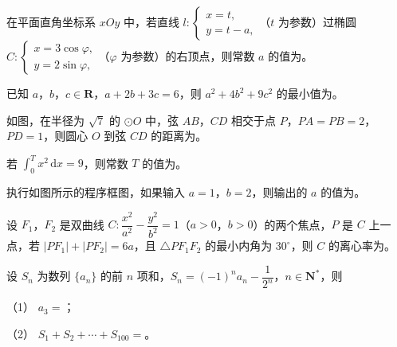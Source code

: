 \begin{question}
在平面直角坐标系 $xOy$ 中，若直线 $l:\begin{cases}x=t,\\y=t-a,\end{cases}$（$t$ 为参数）过椭圆 $C:\begin{cases}x=3\cos\varphi,\\y=2\sin\varphi,\end{cases}$（$\varphi$ 为参数）的右顶点，则常数 $a$ 的值为\gkblank{}。

\end{question}
\begin{question}
已知 $a$，$b$，$c\in\mathbf R$，$a+2b+3c=6$，则 $a^2+4b^2+9c^2$ 的最小值为\gkblank{}。

\Needspace{0.4\textheight}
\end{question}
\begin{question}
如图，在半径为 $\sqrt7$ 的 $\odot O$ 中，弦 $AB$，$CD$ 相交于点 $P$，$PA=PB=2$，$PD=1$，则圆心 $O$ 到弦 $CD$ 的距离为\gkblank{}。
\nopagebreak[4]
\begin{center}\end{center}
\nopagebreak[4]
\end{question}
\begin{question}
若 $\displaystyle\int_0^T x^2\,\mathrm dx=9$，则常数 $T$ 的值为\gkblank{}。

\Needspace{0.4\textheight}
\end{question}
\begin{question}
执行如图所示的程序框图，如果输入 $a=1$，$b=2$，则输出的 $a$ 的值为\gkblank{}。
\nopagebreak[4]
\begin{center}\end{center}
\nopagebreak[4]
\end{question}
\begin{question}
设 $F_1$，$F_2$ 是双曲线 $C:\dfrac{x^2}{a^2}-\dfrac{y^2}{b^2}=1$（$a>0$，$b>0$）的两个焦点，$P$ 是 $C$ 上一点，若 $|PF_1|+|PF_2|=6a$，且 $\triangle PF_1F_2$ 的最小内角为 $30^\circ$，则 $C$ 的离心率为\gkblank{}。

\end{question}
\begin{question}
设 $S_n$ 为数列 $\{a_n\}$ 的前 $n$ 项和，$S_n=(-1)^na_n-\dfrac1{2^n}$，$n\in\mathbf N^*$，则

（1） $a_3=$\gkblank{}；

（2） $S_1+S_2+\cdots+S_{100}=$\gkblank{}。

\end{question}
